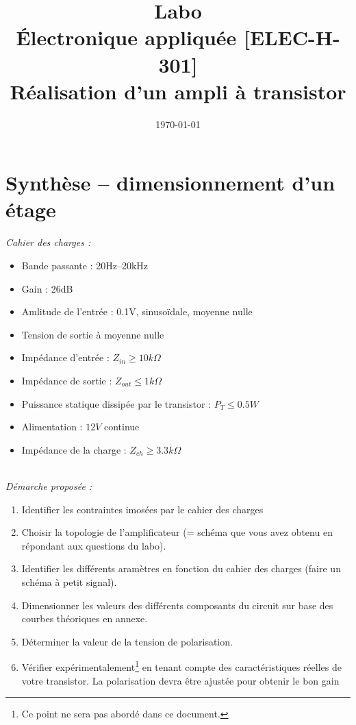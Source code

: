 \documentclass[11pt,a4paper]{article}
\date{\vspace{-1cm}\mydate\today}
\title{\vspace{-2cm} Labo \no 4\\ Électronique appliquée [ELEC-H-301]\\Réalisation d'un ampli à transistor\ifthenelse{\boolean{corrige}}{~\\Corrigé}{}}
\theoremstyle{definition}%
\begin{document}
%
\section{Synthèse -- dimensionnement d'un étage}

\textit{Cahier des charges :}
\begin{itemize}
\item Bande passante : 20Hz--20kHz
\item Gain : 26dB
\item Amlitude de l'entrée : 0.1V, sinusoïdale, moyenne nulle
\item Tension de sortie à moyenne nulle
\item Impédance d'entrée : $Z_{in}\geq10k\Omega$
\item Impédance de sortie : $Z_{out}\leq 1k\Omega$
\item Puissance statique dissipée par le transistor : $P_T\leq 0.5W$
\item Alimentation : $12V$ continue
\item Impédance de la charge : $Z_{ch}\geq 3.3k\Omega$
\end{itemize}


~\\
\textit{Démarche proposée :}
\begin{enumerate}
\item Identifier les contraintes imosées par le cahier des charges
\item Choisir la topologie de l'amplificateur (= schéma que vous avez obtenu en répondant aux questions du labo).
\item Identifier les différents aramètres en fonction du cahier des charges (faire un schéma à petit signal).
\item Dimensionner les valeurs des différents composants du circuit sur base des courbes théoriques en annexe.
\item Déterminer la valeur de la tension de polarisation.
\item {Vérifier expérimentalement}\footnote{Ce point ne sera pas abordé dans ce document.} en tenant compte des caractéristiques réelles de votre transistor. La polarisation devra être ajustée pour obtenir le bon gain
\end{enumerate}
\end{document}

